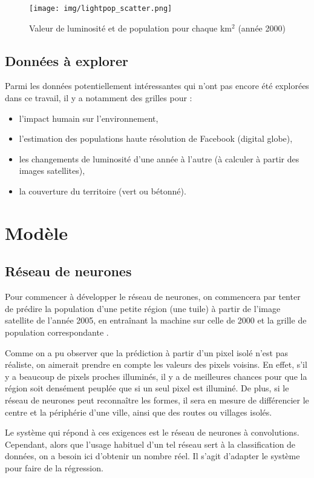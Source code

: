 \documentclass[a4paper, 11pt]{report}
\begin{document}
\begin{figure}[h]
	\centering
	\texttt{[image: img/lightpop\_scatter.png]}
	\caption{Valeur de luminosité et de population pour chaque km$^2$ (année 2000)}
	\label{lightpop_scatter}
\end{figure}

\section{Données à explorer}
Parmi les données potentiellement intéressantes qui n'ont pas encore été explorées dans ce travail, il y a notamment des grilles pour :
\begin{itemize}
	\item l'impact humain sur l'environnement,
	\item l'estimation des populations haute résolution de Facebook (digital globe),
	\item les changements de luminosité d'une année à l'autre (à calculer à partir des images satellites),
	\item la couverture du territoire (vert ou bétonné).
\end{itemize}

\chapter{Modèle}
\section{Réseau de neurones}
Pour commencer à développer le réseau de neurones, on commencera par tenter de prédire la population d'une petite région (une tuile) à partir de l'image satellite de l'année 2005, en entraînant la machine sur celle de 2000 et la grille de population correspondante \cite{sedac}.

Comme on a pu observer que la prédiction à partir d'un pixel isolé n'est pas réaliste, on aimerait prendre en compte les valeurs des pixels voisins. En effet, s'il y a beaucoup de pixels proches illuminés, il y a de meilleures chances pour que la région soit densément peuplée que si un seul pixel est illuminé. De plus, si le réseau de neurones peut reconnaître les formes, il sera en mesure de différencier le centre et la périphérie d'une ville, ainsi que des routes ou villages isolés.

Le système qui répond à ces exigences est le réseau de neurones à convolutions. Cependant, alors que l'usage habituel d'un tel réseau sert à la classification de données, on a besoin ici d'obtenir un nombre réel. Il s'agit d'adapter le système pour faire de la régression.
\end{document}
